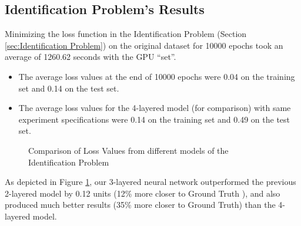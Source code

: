 \documentclass[12pt]{article}
\begin{document}
    \subsection{Identification Problem's Results}
    Minimizing the loss function in the Identification Problem (Section \ref{sec:Identification Problem}) on the original dataset for 10000 epochs took an average of 1260.62 seconds with the GPU ``set''.
    \begin{itemize}
        \item The average loss values at the end of 10000 epochs were 0.04 on the training set and 0.14 on the test set.
        \item The average loss values for the 4-layered model (for comparison) with same experiment specifications were 0.14 on the training set and 0.49 on the test set.
    \end{itemize}
    \begin{figure}
        \centering
        \caption{Comparison of Loss Values from different models of the Identification Problem}
        \label{fig:Comparison of Loss Values from different models of the Identification Problem}
    \end{figure}

    As depicted in Figure \ref{fig:Comparison of Loss Values from different models of the Identification Problem}, our 3-layered neural network outperformed the previous 2-layered model by 0.12 units (12\% more closer to Ground Truth \cite[Table 1]{Xue2016Avi2}), and also produced much better results (35\% more closer to Ground Truth) than the 4-layered model. \\
    
\end{document}

